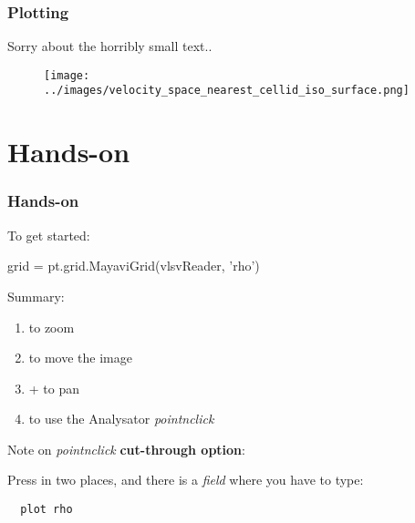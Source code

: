 \documentclass{beamer}
\begin{document}
\begin{frame}[fragile]
 \frametitle{Plotting}
 \begin{center}
 \end{center}
 
 \tiny{Sorry about the horribly small text..}
 
 \begin{figure}
  \centering
  \texttt{[image: ../images/velocity\_space\_nearest\_cellid\_iso\_surface.png]}
  \label{fig:mayavi_example3}
 \end{figure}
\end{frame}

\section{Hands-on}

\begin{frame}[fragile]
 \frametitle{Hands-on}
 
 To get started:
 
 \begin{python}[basicstyle=\tiny]
  grid = pt.grid.MayaviGrid(vlsvReader, 'rho')
 \end{python}
 
 Summary:
 
 \begin{enumerate}
  \item {} to zoom
  \item {} to move the image
  \item {} +  to pan
  \item {} to use the Analysator \emph{pointnclick}
 \end{enumerate}

 
 \tiny{Note on \emph{pointnclick} \textbf{cut-through option}:
 
 Press  in two places, and there is a \emph{field} where you have to type:}
 \begin{verbatim}
  plot rho
 \end{verbatim}
\end{frame}
\end{document}
